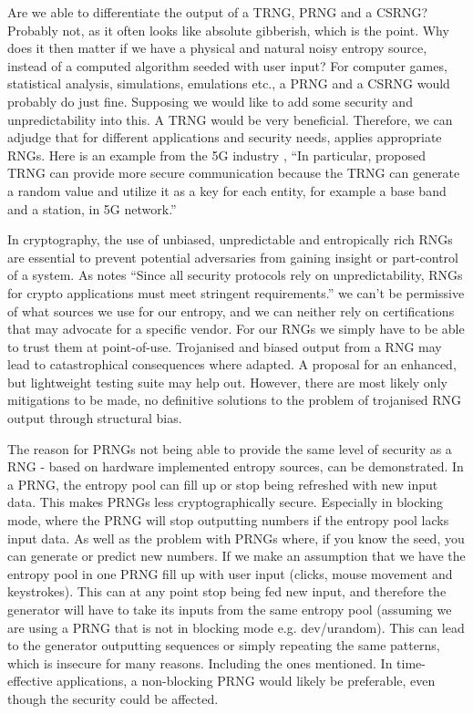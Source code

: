\documentclass[]{final_report}
\begin{document}
\par{Are we able to differentiate the output of a TRNG, PRNG and a CSRNG? Probably not, as it often looks like absolute gibberish, which is the point. Why does it then matter if we have a physical and natural noisy entropy source, instead of a computed algorithm seeded with user input? For computer games, statistical analysis, simulations, emulations etc., a PRNG and a CSRNG would probably do just fine. Supposing we would like to add some security and unpredictability into this. A TRNG would be very beneficial. Therefore, we can adjudge that for different applications and security needs, applies appropriate RNGs. Here is an example from the 5G industry \cite{Lee:2018}, ``In particular, proposed TRNG can provide more secure communication because the TRNG can generate a random value and utilize it as a key for each entity, for example a base band and a station, in 5G network.''}

\par{In cryptography, the use of unbiased, unpredictable and entropically rich RNGs are essential to prevent potential adversaries from gaining insight or part-control of a system. As \cite{Thamrin:2008} notes ``Since all security protocols rely on unpredictability, RNGs for crypto applications must meet stringent requirements.'' we can't be permissive of what sources we use for our entropy, and we can neither rely on certifications that may advocate for a specific vendor. For our RNGs we simply have to be able to trust them at point-of-use. Trojanised and biased output from a RNG may lead to catastrophical consequences where adapted. A proposal for an enhanced, but lightweight testing suite may help out. However, there are most likely only mitigations to be made, no definitive solutions to the problem of trojanised RNG output through structural bias.}

\par{The reason for PRNGs not being able to provide the same level of security as a RNG - based on hardware implemented entropy sources, can be demonstrated. In a PRNG, the entropy pool can fill up or stop being refreshed with new input data. This makes PRNGs less cryptographically secure. Especially in blocking mode, where the PRNG will stop outputting numbers if the entropy pool lacks input data. As well as the problem with PRNGs where, if you know the seed, you can generate or predict new numbers. If we make an assumption that we have the entropy pool in one PRNG fill up with user input (clicks, mouse movement and keystrokes). This can at any point stop being fed new input, and therefore the generator will have to take its inputs from the same entropy pool (assuming we are using a PRNG that is not in blocking mode e.g. dev/urandom). This can lead to the generator outputting sequences or simply repeating the same patterns, which is insecure for many reasons. Including the ones mentioned. In time-effective applications, a non-blocking PRNG would likely be preferable, even though the security could be affected.}
\end{document}
